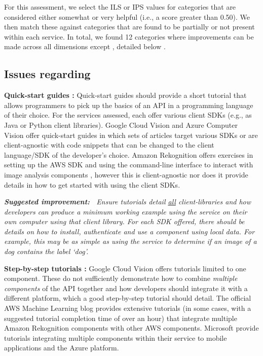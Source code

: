 \def\SuggestedImprovement{\noindent\itshape\small\textbf{\faHandORight{} Suggested improvement:~}}

For this assessment, we select the ILS or IPS values for categories that are considered either somewhat or very helpful (i.e., a score greater than 0.50). We then match these against categories that are found to be partially or not present within each service. In total, we found 12 categories where improvements can be made across all dimensions except \dime{}, detailed below .

\subsection[Dimension A Issues]{Issues regarding \dima{}}

\noindent
\textbf{Quick-start guides :} 
Quick-start guides should provide a short tutorial that allows programmers to pick up the basics of an API in a programming language of their choice. For the services assessed, each offer various client SDKs (e.g., as Java or Python client libraries). Google Cloud Vision and Azure Computer Vision offer quick-start guides  in which sets of articles target various SDKs or are client-agnostic with code snippets that can be changed to the client language/SDK of the developer's choice. Amazon Rekognition offers exercises in setting up the AWS SDK and using the command-line interface to interact with image analysis components , however this is client-agnostic nor does it provide details in how to get started with using the client SDKs.


\begin{leftbar}
\SuggestedImprovement
Ensure tutorials detail \uline{all} client-libraries and how developers can produce a minimum working example using the service on their own computer using that client library. For each SDK offered, there should be details on how to install, authenticate and use a component using local data. For example, this may be as simple as using the service to determine if an image of a dog contains the label `dog'.
\end{leftbar}

\noindent
\textbf{Step-by-step tutorials :}  Google Cloud Vision offers tutorials limited to one component. These do not sufficiently demonstrate how to combine \textit{multiple components} of the API together and how developers should integrate it with a different platform, which a good step-by-step tutorial should detail. The official AWS Machine Learning blog  provides extensive tutorials (in some cases, with a suggested tutorial completion time of over an hour) that integrate multiple Amazon Rekognition components with other AWS components. Microsoft provide tutorials  integrating multiple components within their service to mobile applications and the Azure platform. 

